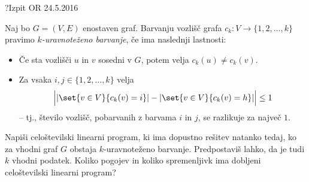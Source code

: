 \begin{naloga}{?}{Izpit OR 24.5.2016}
\begin{vprasanje}
Naj bo $G = (V, E)$ enostaven graf.
Barvanju vozlišč grafa $c_k : V \to \{1, 2, \dots, k\}$
pravimo {\em $k$-uravnoteženo barvanje},
če ima naslednji lastnosti:
\begin{itemize}
\item Če sta vozlišči $u$ in $v$ sosedni v $G$,
potem velja $c_k(u) \ne c_k(v)$.
\item Za vsaka $i, j \in \{1, 2, \dots, k\}$ velja
$$
\Big| |\set{v \in V}{c_k(v) = i}| - |\set{v \in V}{c_k(v) = h}| \Big|
\le 1
$$
-- tj., število vozlišč, pobarvanih z barvama $i$ in $j$,
se razlikuje za največ $1$.
\end{itemize}
Napiši celoštevilski linearni program, ki ima dopustno rešitev natanko tedaj,
ko za vhodni graf $G$ obstaja $k$-uravnoteženo barvanje.
Predpostaviš lahko, da je tudi $k$ vhodni podatek.
Koliko pogojev in koliko spremenljivk
ima dobljeni celoštevilski linearni program?
\end{vprasanje}
\begin{odgovor}
\end{odgovor}
\end{naloga}
